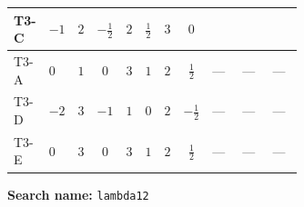 \documentclass[8pt]{article}
\begin{document}
\begin{landscape}
\begin{longtable}{@{}llcccccc >{\raggedright\arraybackslash}p{0.21\linewidth} >{\raggedright\arraybackslash}p{0.21\linewidth} >{\raggedright\arraybackslash}p{0.21\linewidth}@{}}
\midrule
T3-C & $-1$ & $2$ & $-\frac{1}{2}$ & $2$ & $\frac{1}{2}$ & $3$ & $0$ & \scriptsize\adjustbox{max width=\linewidth}{$\begin{gathered} 2 {\lambda_{H H^\dagger S_1^\dagger S_2^\dagger}^{\rm Cross}} \left({\lambda_{H H^\dagger S_1^\dagger S_2^\dagger}^{\rm Cross}}\right)^{*}\end{gathered}$} & \scriptsize\adjustbox{max width=\linewidth}{$\begin{gathered} +24 {\lambda_{S_1^{\dagger 2}S_2^{\dagger 2}}} \left({\lambda_{S_1^{\dagger 2}S_2^{\dagger 2}}}\right)^{*}\end{gathered}$} & \scriptsize\adjustbox{max width=\linewidth}{$\begin{gathered} +9 {\lambda_{S_1^\dagger S_2 S_2^{\dagger 2}}} (\left({\lambda_{S_1^\dagger S_2 S_2^{\dagger 2}}}\right)^{*}+\left({\lambda_{S_1 S_1^{\dagger 2}S_2^\dagger}}\right)^{*})\end{gathered}$} \\
\midrule
T3-A & $0$ & $1$ & $0$ & $3$ & $1$ & $2$ & $\frac{1}{2}$ & --- & --- & --- \\
\midrule
T3-D & $-2$ & $3$ & $-1$ & $1$ & $0$ & $2$ & $-\frac{1}{2}$ & --- & --- & --- \\
\midrule
T3-E & $0$ & $3$ & $0$ & $3$ & $1$ & $2$ & $\frac{1}{2}$ & --- & --- & --- \\
\midrule
\bottomrule
\end{longtable}
\clearpage
\noindent\textbf{Search name: }\texttt{lambda12}\par\smallskip

\end{landscape}
\end{document}
